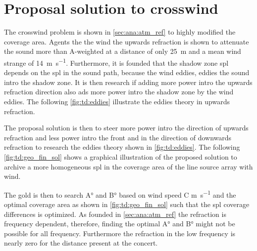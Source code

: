 \section{Proposal solution to crosswind}\label{sec:des:pro_cross}
The crosswind problem is shown in \autoref{sec:ana:atm_ref} to highly modified the coverage area. Agents the the wind the upwards refraction is shown to attenuate the sound more than  A-weighted at a distance of only \SI{25}{\meter} and a mean wind strange of \SI{14}{\meter\per\second}. Furthermore, it is founded that the shadow zone \gls{spl} depends on the \gls{spl} in the sound path, because the wind eddies, eddies the sound intro the shadow zone. It is then research if adding more power intro the upwards refraction direction also ads more power intro the shadow zone by the wind eddies. The following \autoref{fig:td:eddies} illustrate the eddies theory in upwards refraction.


The proposal solution is then to steer more power intro the direction of upwards refraction and less power intro the front and in the direction of downwards refraction to research the eddies theory shown in \autoref{fig:td:eddies}. The following \autoref{fig:td:geo_fin_sol} shows a graphical illustration of the proposed solution to archive a more homogeneous \gls{spl} in the coverage area of the line source array with wind.


The gold is then to search A\si{\degree} and B\si{\degree} based on wind speed C \si{\meter\per\second} and the optimal coverage area as shown in \autoref{fig:td:geo_fin_sol} such that the \gls{spl} coverage differences is optimized. As founded in \autoref{sec:ana:atm_ref} the refraction is frequency dependent, therefore, finding the optimal  A\si{\degree} and B\si{\degree} might not be possible for all frequency. Furthermore the refraction in the low frequency is nearly zero for the distance present at the concert. 




